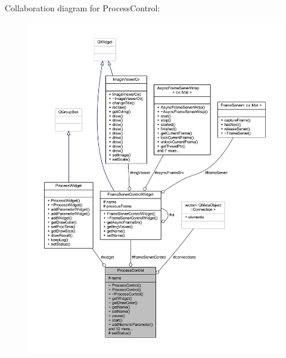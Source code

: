 Collaboration diagram for Process\+Control\+:
\nopagebreak
\begin{figure}[H]
\begin{center}
\leavevmode
\includegraphics[width=350pt]{class_process_control__coll__graph}
\end{center}
\end{figure}

